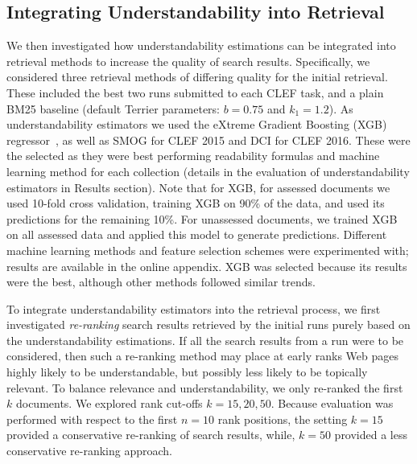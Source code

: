 \subsection{Integrating Understandability into Retrieval}
\label{sec:method_ltr}

We then investigated how understandability estimations can be integrated into retrieval methods to increase the quality of search results. %
Specifically, we considered three retrieval methods of differing quality for the initial retrieval. These included the best two runs submitted to each CLEF task, and a plain BM25 baseline (default Terrier parameters: $b=0.75$ and $k_1=1.2$). As understandability estimators we used the eXtreme Gradient Boosting (XGB) regressor~\cite{chen16}, as well as SMOG for CLEF 2015 and DCI for CLEF 2016. 
These were the selected as they were best performing readability formulas and machine learning method for each collection (details in the evaluation of understandability estimators in Results section).
Note that for XGB, for assessed documents we used 10-fold cross validation, training XGB on 90\% of the data, and used its predictions for the remaining 10\%. For unassessed documents, we trained XGB on all assessed data and applied this model to generate predictions. Different machine learning methods and feature selection schemes were experimented with; results are available in the online appendix. XGB was selected because its results were the best, although other methods followed similar trends.


To integrate understandability estimators into the retrieval process, we first investigated \textit{re-ranking} search results retrieved by the initial runs purely based on the understandability estimations. 
If all the search results from a run were to be considered, then such a re-ranking method may place at early ranks Web pages highly likely to be understandable, but possibly less likely to be topically relevant. To balance relevance and understandability, we only re-ranked the first $k$ documents. We explored rank cut-offs $k = 15, 20, 50$. Because evaluation was performed with respect to the first $n=10$ rank positions, the setting $k=15$ provided a conservative re-ranking of search results, while, $k=50$ provided a less conservative re-ranking approach.

